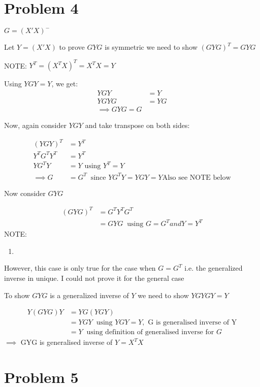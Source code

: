 \documentclass[a4paper]{article}
\begin{document}
\section*{Problem 4}
$G=(X'X)^-$

Let $Y=(X'X)$  to prove $GYG$ is symmetric we need to show $(GYG)^T=GYG$

NOTE: $Y^T=(X^TX)^T=X^TX=Y$

Using $YGY=Y$, we get:
\begin{align*}
YGY &= Y\\
YGYG &= YG\\
\implies GYG=G
\end{align*}

Now, again consider $YGY$ and take transpose on both sides:

\begin{align*}
(YGY)^T &= Y^T\\
Y^TG^TY^T &= Y^T\\
YG^TY &= Y \text{ using } Y^T=Y\\
\implies G&=G^T \ \text{ since }YG^TY=YGY=Y \text{Also see NOTE below}
\end{align*}

Now consider $GYG$

\begin{align*}
(GYG)^T &= G^TY^TG^T\\
&= GYG \ \text{ using } G=G^T and Y=Y^T
\end{align*}
NOTE: 
\begin{enumerate}
\item 
\end{enumerate}
However, this case is only true for the case when $G=G^T$ i.e. the generalized inverse in unique. I could not prove it for the general case

To show $GYG$ is a generalized inverse of $Y$ we need to show $YGYGY = Y$

\begin{align*}
Y(GYG)Y &= YG(YGY)\\
&= YGY\ \text{ using } YGY=Y, \text{ G is generalised inverse of Y}\\
&= Y\ \text{ using definition of generalised inverse for } G
\end{align*}
$\implies$ GYG is generalised inverse of $Y=X^TX$

\section*{Problem 5}
\end{document}
